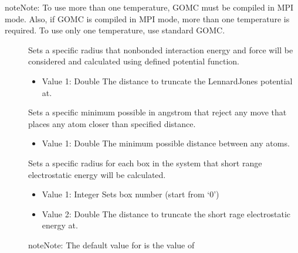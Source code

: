 \documentclass[letterpaper,10pt,english]{sphinxmanual}
\begin{document}
\begin{sphinxadmonition}{note}{Note:}
\sphinxAtStartPar
To use more than one temperature, GOMC must be compiled in MPI mode.  Also, if GOMC is compiled in MPI mode, more than one temperature is required.  To use only one temperature, use standard GOMC.
\end{sphinxadmonition}
\begin{description}
\item[{}] \leavevmode
\sphinxAtStartPar
Sets a specific radius that non\sphinxhyphen{}bonded interaction energy and force will be considered and calculated using defined potential function.
\begin{itemize}
\item {} 
\sphinxAtStartPar
Value 1: Double \sphinxhyphen{} The distance to truncate the Lennard\sphinxhyphen{}Jones potential at.

\end{itemize}

\item[{}] \leavevmode
\sphinxAtStartPar
Sets a specific minimum possible in angstrom that reject any move that places any atom closer than specified distance.
\begin{itemize}
\item {} 
\sphinxAtStartPar
Value 1: Double \sphinxhyphen{} The minimum possible distance between any atoms.

\end{itemize}

\item[{}] \leavevmode
\sphinxAtStartPar
Sets a specific radius for each box in the system that short range electrostatic energy will be calculated.
\begin{itemize}
\item {} 
\sphinxAtStartPar
Value 1: Integer \sphinxhyphen{} Sets box number (start from ‘0’)

\item {} 
\sphinxAtStartPar
Value 2: Double \sphinxhyphen{} The distance to truncate the short rage electrostatic energy at.

\end{itemize}

\begin{sphinxadmonition}{note}{Note:}
\sphinxAtStartPar
The default value for  is the value of 
\end{sphinxadmonition}


\end{description}
\end{document}
